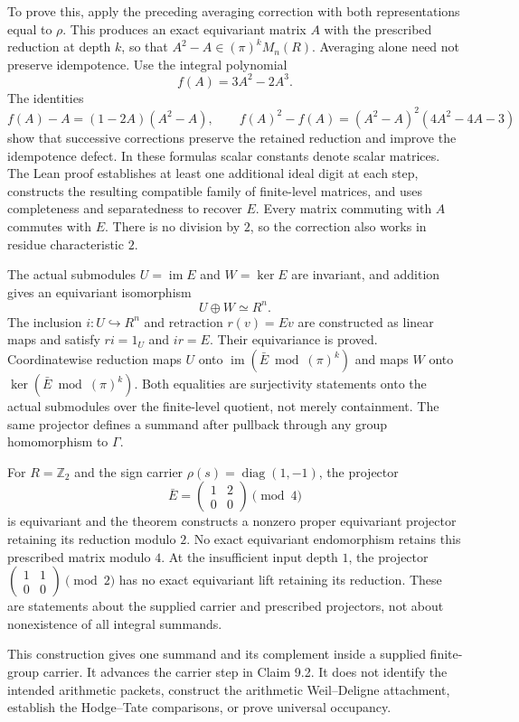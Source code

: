 \documentclass[11pt]{article}
\theoremstyle{definition}
\theoremstyle{remark}
\begin{document}
To prove this, apply the preceding averaging correction with both
representations equal to $\rho$. This produces an exact equivariant matrix
$A$ with the prescribed reduction at depth $k$, so that
$A^2-A\in(\pi)^kM_n(R)$. Averaging alone need not preserve idempotence.
Use the integral polynomial
\[
f(A)=3A^2-2A^3.
\]
The identities
\[
f(A)-A=(1-2A)(A^2-A),\qquad
f(A)^2-f(A)=(A^2-A)^2(4A^2-4A-3)
\]
show that successive corrections preserve the retained reduction and improve
the idempotence defect. In these formulas scalar constants denote scalar
matrices. The Lean proof establishes at least one additional ideal digit at
each step, constructs the resulting compatible family of finite-level matrices, and uses
completeness and separatedness to recover $E$. Every matrix commuting with
$A$ commutes with $E$. There is no division by $2$, so the correction also
works in residue characteristic $2$.

The actual submodules $U=\operatorname{im}E$ and $W=\ker E$ are invariant,
and addition gives an equivariant isomorphism
\[
U\oplus W\simeq R^n.
\]
The inclusion $i:U\hookrightarrow R^n$ and retraction $r(v)=Ev$ are
constructed as linear maps and satisfy $ri=1_U$ and $ir=E$. Their
equivariance is proved. Coordinatewise reduction maps $U$ onto
$\operatorname{im}(\bar E\bmod(\pi)^k)$ and maps $W$ onto
$\ker(\bar E\bmod(\pi)^k)$. Both equalities are surjectivity statements
onto the actual submodules over the finite-level quotient, not merely containment. The same
projector defines a summand after pullback through any group homomorphism
to $\Gamma$.

For $R=\mathbb Z_2$ and the sign carrier
$\rho(s)=\operatorname{diag}(1,-1)$, the projector
\[
\bar E=\begin{pmatrix}1&2\\0&0\end{pmatrix}\pmod4
\]
is equivariant and the theorem constructs a nonzero proper equivariant
projector retaining its reduction modulo $2$. No exact equivariant
endomorphism retains this prescribed matrix modulo $4$. At the insufficient
input depth $1$, the projector
$\left(\begin{smallmatrix}1&1\\0&0\end{smallmatrix}\right)\pmod2$
has no exact equivariant lift retaining its reduction. These are statements
about the supplied carrier and prescribed projectors, not about nonexistence
of all integral summands.

This construction gives one summand and its complement inside a supplied
finite-group carrier. It advances the carrier step in Claim 9.2. It does
not identify the intended arithmetic packets, construct the arithmetic
Weil--Deligne attachment, establish the Hodge--Tate comparisons, or prove
universal occupancy.
\end{document}
